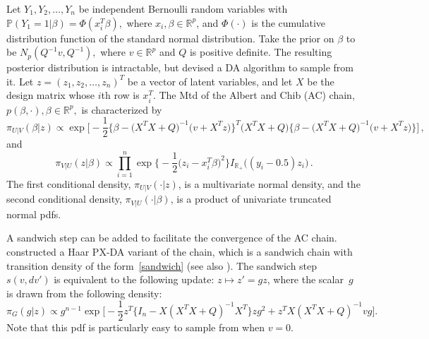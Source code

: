 \documentclass[11pt]{article}
\begin{document}
	Let $Y_1,Y_2,\dots, Y_n$ be independent Bernoulli random
        variables with $\mathbb{P}(Y_1=1|\beta) = \Phi(x_i^T\beta),$ where $x_i,\beta
        \in \mathbb{R}^p$, and $\Phi(\cdot)$ is the cumulative distribution function of the standard normal distribution.  Take the prior on $\beta$ to be
        $N_p(Q^{-1}v, Q^{-1}),$ where $v \in \mathbb{R}^p$ and $Q$ is
        positive definite. The resulting posterior distribution is
        intractable, but \cite{albert1993bayesian} devised a DA
        algorithm to sample from it. Let $z=(z_1,z_2,\dots,z_n)^T$ be
        a vector of latent variables, and let $X$ be the design matrix
        whose $i$th row is $x_i^T.$ The Mtd of the Albert and Chib
        (AC) chain, $p(\beta,\cdot), \beta \in \mathbb{R}^p,$ is
        characterized by
	\[
        \pi_{U|V} (\beta|z) \propto \exp \bigg[ -\frac{1}{2} \big\{
        \beta - \big( X^TX+Q \big)^{-1} \big( v+X^Tz \big) \big\}^T
        \big( X^TX + Q \big) \big\{ \beta - \big( X^TX+Q \big)^{-1}
        \big( v+X^Tz \big) \big\} \bigg] \,,
        \]
        and
        \[
        \pi_{V|U}(z|\beta) \propto \prod_{i=1}^{n}\exp \bigg\{
        -\frac{1}{2}\big(z_i-x_i^T\beta\big)^2 \bigg\}
        I_{\mathbb{R}_+}\big((y_i-0.5)z_i \big) \,.
        \]
	The first conditional density, $\pi_{U|V}(\cdot|z)$, is a
        multivariate normal density, and the second conditional
        density, $\pi_{V|U}(\cdot|\beta)$, is a product of univariate
        truncated normal pdfs.  
        
        A sandwich step can be added to facilitate the convergence of
        the AC chain. \cite{chakraborty2016convergence} constructed a
        Haar PX-DA variant of the chain, which is a sandwich chain
        with transition density of the form~\eqref{sandwich} (see also
        \cite{roy2007convergence}). The sandwich step $s(v, dv')$ is
        equivalent to the following update: $z \mapsto z' = gz$, where
        the scalar~$g$ is drawn from the following density:
        \[
        \pi_G(g|z) \propto g^{n-1} \exp \bigg[ -\frac{1}{2} z^T\big\{ I_n - X(X^TX+Q)^{-1}X^T \big\} z g^2 + z^TX(X^TX + Q)^{-1}v g   \bigg].
        \]
        Note that this pdf is particularly easy to sample from when $v = 0$.
        
\end{document}
